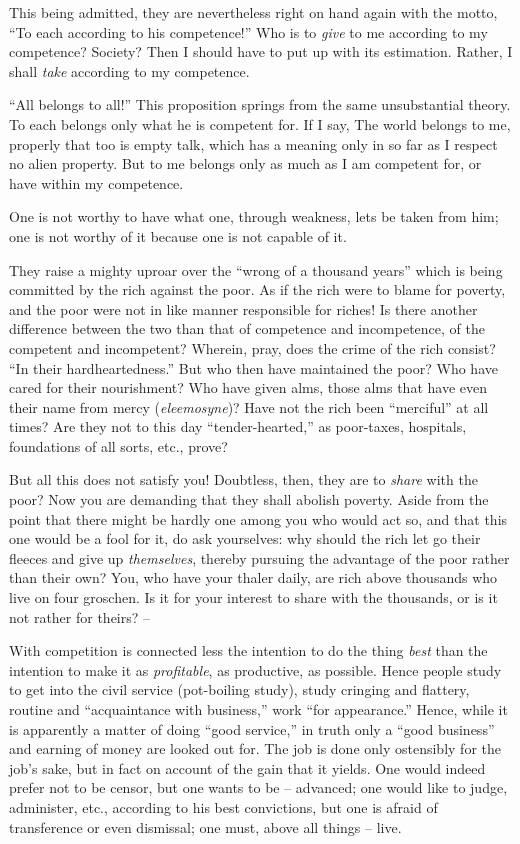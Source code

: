 \documentclass[12pt,a4paper]{book}
\begin{document}
This being admitted, they are nevertheless right on hand again with the motto, 
``To each according to his competence!'' Who is to \textit{give} to me 
according to my competence? Society? Then I should have to put up with its 
estimation. Rather, I shall \textit{take} according to my competence.

``All belongs to all!'' This proposition springs from the same unsubstantial 
theory. To each belongs only what he is competent for. If I say, The world 
belongs to me, properly that too is empty talk, which has a meaning only in so 
far as I respect no alien property. But to me belongs only as much as I am 
competent for, or have within my competence.

One is not worthy to have what one, through weakness, lets be taken from him; 
one is not worthy of it because one is not capable of it.

They raise a mighty uproar over the ``wrong of a thousand years'' which is 
being committed by the rich against the poor. As if the rich were to blame for 
poverty, and the poor were not in like manner responsible for riches! Is there 
another difference between the two than that of competence and incompetence, 
of the competent and incompetent? Wherein, pray, does the crime of the rich 
consist? ``In their hardheartedness.'' But who then have maintained the 
poor? Who have cared for their nourishment? Who have given alms, those alms 
that have even their name from mercy (\textit{eleemosyne})? Have not the rich 
been ``merciful'' at all times? Are they not to this day 
``tender-hearted,'' as poor-taxes, hospitals, foundations of all sorts, 
etc., prove?

But all this does not satisfy you! Doubtless, then, they are to \textit{share} 
with the poor? Now you are demanding that they shall abolish poverty. Aside 
from the point that there might be hardly one among you who would act so, and 
that this one would be a fool for it, do ask yourselves: why should the rich 
let go their fleeces and give up \textit{themselves}, thereby pursuing the 
advantage of the poor rather than their own? You, who have your thaler daily, 
are rich above thousands who live on four groschen. Is it for your interest to 
share with the thousands, or is it not rather for theirs? --

With competition is connected less the intention to do the thing \textit{best} 
than the intention to make it as \textit{profitable}, as productive, as 
possible. Hence people study to get into the civil service (pot-boiling 
study), study cringing and flattery, routine and ``acquaintance with 
business,'' work ``for appearance.'' Hence, while it is apparently a matter 
of doing ``good service,'' in truth only a ``good business'' and earning 
of money are looked out for. The job is done only ostensibly for the job's 
sake, but in fact on account of the gain that it yields. One would indeed 
prefer not to be censor, but one wants to be -- advanced; one would like to 
judge, administer, etc., according to his best convictions, but one is afraid 
of transference or even dismissal; one must, above all things -- live.
\end{document}
